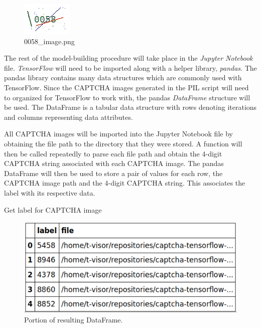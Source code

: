 \documentclass[11pt,conference]{IEEEtran}
\begin{document}
\begin{figure}[htbp]
	\centerline{\includegraphics[scale=1.5]{images/0058_image.png}}
	\caption{0058\_image.png}
	\label{figure}
\end{figure}

The rest of the model-building procedure will take place in the \emph{Jupyter
Notebook}
file. \emph{TensorFlow} will need to be imported along with a helper library,
\emph{pandas}. The pandas library contains many data structures which are
commonly used with TensorFlow. Since the CAPTCHA images generated in
the PIL script will need to organized for TensorFlow to work with, the pandas
\emph{DataFrame} structure will be used. The DataFrame is a tabular data
structure with rows denoting iterations and columns representing data
attributes.

All CAPTCHA images will be imported into the Jupyter Notebook file by obtaining
the file path to the directory that they were stored. A function will then
be called repeatedly to parse each file path and obtain the 4-digit CAPTCHA string associated with each
CAPTCHA image. The pandas DataFrame will then be used to store a pair of values
for each row, the CAPTCHA image path and the 4-digit CAPTCHA string. This
associates the label with its respective data.


\begin{algorithm}[]

  \caption{Get label for CAPTCHA image}
  \label{alg:exep}
\end{algorithm}

\begin{figure}[htbp]
	\centerline{\includegraphics[scale=0.5]{images/pandas-dataframe.png}}
	\caption{Portion of resulting DataFrame.}
	\label{figure}
\end{figure}
\end{document}
